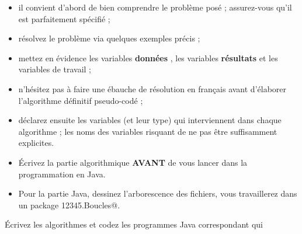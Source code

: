 \documentclass[11pt,a4paper]{article}
\begin{document}
					\begin{itemize}
				
			\item il convient d'abord de bien comprendre le probl\`eme pos\'e ; assurez-vous qu'il est parfaitement sp\'ecifi\'e ;
			\item r\'esolvez le probl\`eme via quelques exemples pr\'ecis ;
			\item mettez en \'evidence les variables \textbf{\guillemotleft  donn\'ees \guillemotright }, les variables \textbf{\guillemotleft  r\'esultats \guillemotright } et les variables de travail ;
			\item n'h\'esitez pas \`a faire une \'ebauche de r\'esolution en fran\c cais avant d'\'elaborer l'algorithme d\'efinitif pseudo-cod\'e ;
			\item d\'eclarez ensuite les variables (et leur type) qui interviennent dans chaque algorithme ; les noms des variables risquant de ne pas \^etre suffisamment explicites.
			\item \'Ecrivez la partie algorithmique \textbf{AVANT} de vous lancer dans la programmation en Java.
			\item Pour la partie Java, dessinez l'arborescence des fichiers, vous travaillerez dans un package  \verb@g12345.Boucles@. 
					\end{itemize}
				
            \par
        
        \'Ecrivez les algorithmes et codez les programmes Java correspondant qui 
          
\end{document}
